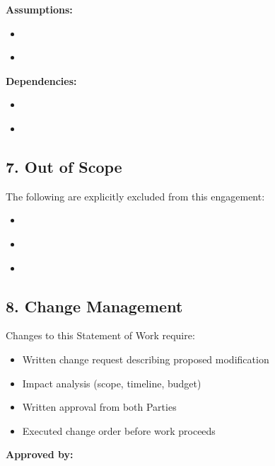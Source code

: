 \documentclass[11pt,a4paper]{article}
\begin{document}
\textbf{Assumptions:}
\begin{itemize}
\item[] \underline{\hspace{12cm}}
\item[] \underline{\hspace{12cm}}
\end{itemize}

\textbf{Dependencies:}
\begin{itemize}
\item[] \underline{\hspace{12cm}}
\item[] \underline{\hspace{12cm}}
\end{itemize}

\subsection*{7. Out of Scope}

The following are explicitly excluded from this engagement:
\begin{itemize}
\item[] \underline{\hspace{12cm}}
\item[] \underline{\hspace{12cm}}
\item[] \underline{\hspace{12cm}}
\end{itemize}

\subsection*{8. Change Management}

Changes to this Statement of Work require:
\begin{itemize}
\item Written change request describing proposed modification
\item Impact analysis (scope, timeline, budget)
\item Written approval from both Parties
\item Executed change order before work proceeds
\end{itemize}

\vspace{2em}

\textbf{Approved by:}

\vspace{1em}
\end{document}
